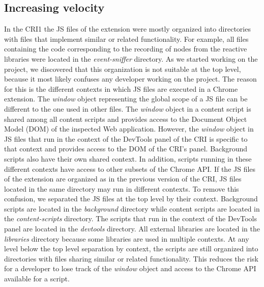 \subsection{Increasing velocity}
In the CRI1 the JS files of the extension were mostly organized into directories with files that implement similar or related functionality. For example, all files containing the code corresponding to the recording of nodes from the reactive libraries were located in the \emph{event-sniffer} directory. As we started working on the project, we discovered that this organization is not suitable at the top level, because it most likely confuses any developer working on the project. The reason for this is the different contexts in which JS files are executed in a Chrome extension. The \emph{window} object representing the global scope of a JS file can be different to the one used in other files. The \emph{window} object in a content script is shared among all content scripts and provides access to the Document Object Model (DOM) of the inspected Web application. However, the \emph{window} object in JS files that run in the context of the DevTools panel of the CRI is specific to that context and provides access to the DOM of the CRI's panel. Background scripts also have their own shared context. In addition, scripts running in these different contexts have access to other subsets of the Chrome API. If the JS files of the extension are organized as in the previous version of the CRI, JS files located in the same directory may run in different contexts. To remove this confusion, we separated the JS files at the top level by their context. Background scripts are located in the \emph{background} directory while content scripts are located in the \emph{content-scripts} directory. The scripts that run in the context of the DevTools panel are located in the \emph{devtools} directory. All external libraries are located in the \emph{libraries} directory because some libraries are used in multiple contexts. At any level below the top level separation by context, the scripts are still organized into directories with files sharing similar or related functionality. This reduces the risk for a developer to lose track of the \emph{window} object and access to the Chrome API available for a script.
